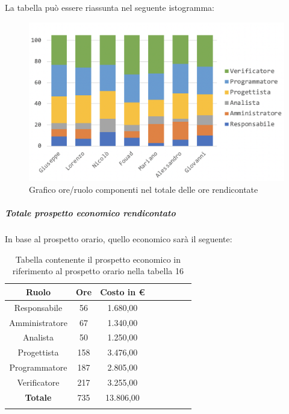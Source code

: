 				La tabella può essere riassunta nel seguente istogramma:
				\begin{figure}[H]
					\centering
					\includegraphics[width=0.8\linewidth]{./images/preventivo/totOreRed1.png}
					\caption{Grafico ore/ruolo componenti nel totale delle ore rendicontate}
					\label{fig:grafico suddivione ruoli totale ore rendicontete}
				\end{figure}
			
				\subparagraph{Totale prospetto economico rendicontato}
				In base al prospetto orario, quello economico sarà il seguente: 
				
				\begin{longtable}{|c|c|c|c|c|c|c|c|}
					\hline
					\rowcolor{lighter-grayer}
					\textbf{Ruolo} & \textbf{Ore} & \textbf{Costo in €} \\
					\hline
					\endfirsthead
					
					\hline
					Responsabile 	    & 56 & 1.680,00\\
					\hline 
					\hline
					Amministratore	  & 67 & 1.340,00\\
					\hline
					\hline
					Analista 				& 50 & 1.250,00\\
					\hline
					\hline
					Progettista 		  & 158 & 3.476,00\\
					\hline
					\hline
					Programmatore 	 & 187 & 2.805,00\\
					\hline
					\hline
					Verificatore 		  & 217 & 3.255,00\\
					\hline
					\textbf{Totale} 	& 735 & 13.806,00\\
					\hline
					\caption{Tabella contenente il prospetto economico in riferimento al prospetto orario nella tabella 16}
				\end{longtable}
				\pagebreak
				
